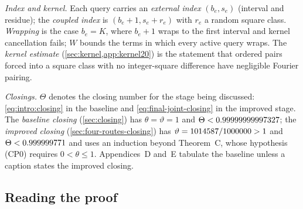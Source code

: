 \emph{Index and kernel.}
Each query carries an \emph{external index} $(b_e,s_e)$ (interval and
residue); the \emph{coupled index} is $(b_e+1,s_e+r_e)$ with $r_e$ a
random square class. \emph{Wrapping} is the case $b_e=K$, where
$b_e+1$ wraps to the first interval and kernel cancellation fails;
$W$ bounds the terms in which every active query wraps. The
\emph{kernel estimate} (\cref{sec:kernel,app:kernel20}) is the
statement that ordered pairs forced into a square class with no
integer-square difference have negligible Fourier pairing.

\emph{Closings.}
$\Theta$ denotes the closing number for the stage being discussed:
\eqref{eq:intro:closing} in the baseline and
\eqref{eq:final-joint-closing} in the improved stage.
The \emph{baseline closing}
(\cref{sec:closing}) has $\theta=\vartheta=1$ and
$\Theta<0.99999999997327$; the \emph{improved closing}
(\cref{sec:four-routes-closing}) has
$\vartheta=1014587/1000000>1$ and $\Theta<0.999999771$ and
uses an induction beyond Theorem~C, whose hypothesis (CP0) requires
$0<\theta\le1$. Appendices~D and~E tabulate the baseline unless a
caption states the improved closing.

\subsection{Reading the proof}\label{subsec:intro:outline}

